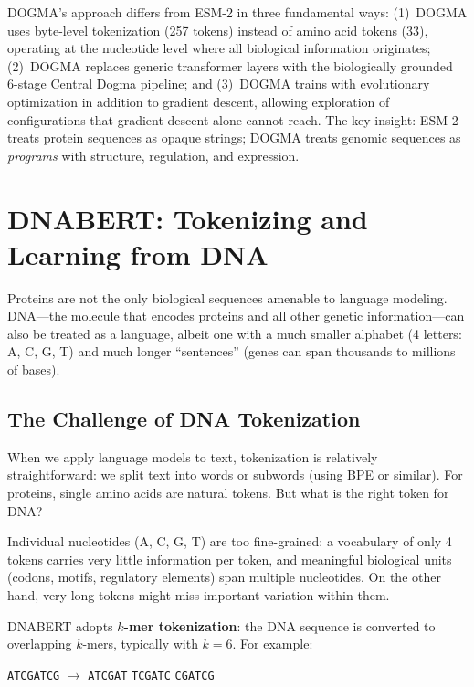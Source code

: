 \begin{implnote}
DOGMA's approach differs from ESM-2 in three fundamental ways: (1)~DOGMA uses byte-level tokenization (257 tokens) instead of amino acid tokens (33), operating at the nucleotide level where all biological information originates; (2)~DOGMA replaces generic transformer layers with the biologically grounded 6-stage Central Dogma pipeline; and (3)~DOGMA trains with evolutionary optimization in addition to gradient descent, allowing exploration of configurations that gradient descent alone cannot reach. The key insight: ESM-2 treats protein sequences as opaque strings; DOGMA treats genomic sequences as \emph{programs} with structure, regulation, and expression.
\end{implnote}

\section{DNABERT: Tokenizing and Learning from DNA}
\label{sec:dnabert}

Proteins are not the only biological sequences amenable to language modeling. DNA---the molecule that encodes proteins and all other genetic information---can also be treated as a language, albeit one with a much smaller alphabet (4 letters: A, C, G, T) and much longer ``sentences'' (genes can span thousands to millions of bases).

\subsection{The Challenge of DNA Tokenization}

When we apply language models to text, tokenization is relatively straightforward: we split text into words or subwords (using BPE or similar). For proteins, single amino acids are natural tokens. But what is the right token for DNA?

Individual nucleotides (A, C, G, T) are too fine-grained: a vocabulary of only 4 tokens carries very little information per token, and meaningful biological units (codons, motifs, regulatory elements) span multiple nucleotides. On the other hand, very long tokens might miss important variation within them.

DNABERT \citep{ji2021dnabert} adopts \textbf{$k$-mer tokenization}: the DNA sequence is converted to overlapping $k$-mers, typically with $k=6$. For example:
\begin{center}
\texttt{ATCGATCG} $\longrightarrow$ \texttt{ATCGAT} \quad \texttt{TCGATC} \quad \texttt{CGATCG}
\end{center}

